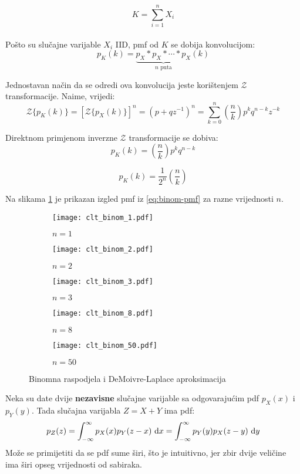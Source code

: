 
$$K = \sum_{i=1}^{n} X_i$$
\\

Pošto su slučajne varijable $X_i$ IID, pmf od $K$ se dobija konvolucijom:
$$p_K(k) = \underbrace{p_X * p_X * \cdots * p_X}_{n\text{ puta}}(k)$$

Jednostavan način da se odredi ova konvolucija jeste korištenjem
$\mathcal{Z}$ transformacije. %
Naime, vrijedi: %
\begin{equation}
  \mathcal{Z}\{p_K(k)\}
  = \left[\mathcal{Z}\{p_X(k)\}\right]^n
  = (p+qz^{-1})^n
  = \sum_{k=0}^{n} \left(\frac{n}{k}\right) p^k q^{n-k} z^{-k}
\end{equation}

Direktnom primjenom inverzne $ \mathcal{Z}$ transformacije se dobiva:
$$p_K(k) = \left(\frac{n}{k}\right) p^kq^{n-k}$$

\begin{equation} \label{eq:binom-pmf}
  p_K(k) = \frac{1}{2^n} \left(\frac{n}{k}\right)
\end{equation}

Na slikama \ref{fig:binom} je prikazan izgled pmf iz \eqref{eq:binom-pmf} za
razne vrijednosti $n$.

\begin{figure}[H]
  \centering
  \begin{subfigure}[b]{0.3\textwidth}
    \centering
    \texttt{[image: clt\_binom\_1.pdf]}
    \caption{$n=1$}
  \end{subfigure}
  \vspace{10pt}
	\begin{subfigure}[b]{0.3\textwidth}
		\centering
    \texttt{[image: clt\_binom\_2.pdf]}
    \caption{$n=2$}
	\end{subfigure}
	\begin{subfigure}[b]{0.3\textwidth}
		\centering
    \texttt{[image: clt\_binom\_3.pdf]}
    \caption{$n=3$}
	\end{subfigure}
	\begin{subfigure}[b]{0.3\textwidth}
		\centering
    \texttt{[image: clt\_binom\_8.pdf]}
    \caption{$n=8$}
	\end{subfigure}
	\begin{subfigure}[b]{0.3\textwidth}
		\centering
    \texttt{[image: clt\_binom\_50.pdf]}
    \caption{$n=50$}
	\end{subfigure}
	\caption{Binomna raspodjela i DeMoivre-Laplace aproksimacija}
  \label{fig:binom}
\end{figure}

Neka su date dvije \textbf{nezavisne} slučajne varijable sa odgovarajućim pdf $p_X(x)$ i
$p_Y(y)$. Tada slučajna varijabla $Z = X + Y$ ima pdf:
$$p_Z(z) = \int_{-\infty}^{\infty} p_X(x) p_Y(z-x) \ \text dx
					 = \int_{-\infty}^{\infty} p_Y(y) p_X(z-y) \ \text dy$$
Može se primijetiti da se pdf sume širi, što je intuitivno, jer zbir dvije
veličine ima širi opseg vrijednosti od sabiraka.

